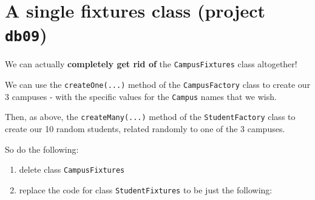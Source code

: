 \documentclass[a4paperpaper,openright]{book}
\begin{document}
\hypertarget{a-single-fixtures-class-project-db09}{%
\section{\texorpdfstring{A single fixtures class (project
\texttt{db09})}{A single fixtures class (project db09)}}\label{a-single-fixtures-class-project-db09}}

We can actually \textbf{completely get rid of} the
\texttt{CampusFixtures} class altogether!

We can use the \texttt{createOne(...)} method of the
\texttt{CampusFactory} class to create our 3 campuses - with the
specific values for the \texttt{Campus} names that we wish.

Then, as above, the \texttt{createMany(...)} method of the
\texttt{StudentFactory} class to create our 10 random students, related
randomly to one of the 3 campuses.

So do the following:

\begin{enumerate}
\def\labelenumi{\arabic{enumi}.}
\item
  delete class \texttt{CampusFixtures}
\item
  replace the code for class \texttt{StudentFixtures} to be just the
  following:
\end{enumerate}
\end{document}

